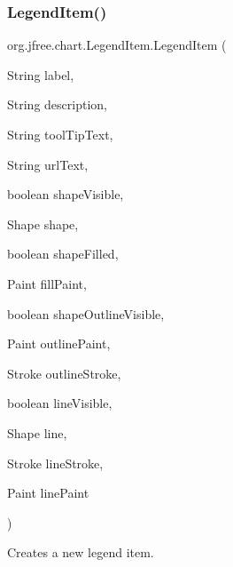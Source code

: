 \subsubsection{\texorpdfstring{Legend\+Item()}{LegendItem()}\hspace{0.1cm}{\footnotesize\ttfamily [6/10]}}
{\footnotesize\ttfamily org.\+jfree.\+chart.\+Legend\+Item.\+Legend\+Item (\begin{DoxyParamCaption}\item[{String}]{label,  }\item[{String}]{description,  }\item[{String}]{tool\+Tip\+Text,  }\item[{String}]{url\+Text,  }\item[{boolean}]{shape\+Visible,  }\item[{Shape}]{shape,  }\item[{boolean}]{shape\+Filled,  }\item[{Paint}]{fill\+Paint,  }\item[{boolean}]{shape\+Outline\+Visible,  }\item[{Paint}]{outline\+Paint,  }\item[{Stroke}]{outline\+Stroke,  }\item[{boolean}]{line\+Visible,  }\item[{Shape}]{line,  }\item[{Stroke}]{line\+Stroke,  }\item[{Paint}]{line\+Paint }\end{DoxyParamCaption})}

Creates a new legend item.


